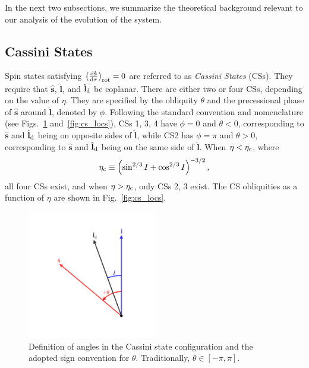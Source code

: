 \documentclass[
        fleqn,
        usenatbib,
    ]{mnras}
\newcommand*{\rd}[2]{\frac{\mathrm{d}#1}{\mathrm{d}#2}}
\newcommand*{\bm}[1]{\boldsymbol{\mathbf{#1}}}
\newcommand*{\uv}[1]{\hat{\bm{#1}}}
\newcommand*{\p}[1]{\left(#1\right)}
\begin{document}
In the next two subsections, we summarize the theoretical background relevant to
our analysis of the evolution of the system.

\subsection{Cassini States}\label{ss:cs}

Spin states satisfying $\p{\rd{\uv{s}}{\tau}}_{\rm rot} = 0$ are referred to as
\emph{Cassini States} (CSs). They require that $\uv{s}$, $\uv{l}$, and
$\uv{l}_{\rm d}$ be coplanar. There are either two or four CSs, depending
on the value of $\eta$. They are specified by the obliquity $\theta$ and the
precessional phase of $\uv{s}$ around $\uv{l}$, denoted by $\phi$. Following
the standard convention and nomenclature (see Figs.~\ref{fig:cs_vecs}
and~\ref{fig:cs_locs}), CSs 1, 3, 4 have $\phi = 0$ and $\theta < 0$,
corresponding to $\uv{s}$ and $\uv{l}_{\rm d}$ being on opposite sides of
$\uv{l}$, while CS2 has $\phi = \pi$ and $\theta > 0$, corresponding to $\uv{s}$
and $\uv{l}_{\rm d}$ being on the same side of $\uv{l}$. When $\eta < \eta_{\rm
c}$, where
\begin{equation}
    \eta_{\rm c} \equiv \p{\sin^{2/3}I + \cos^{2/3}I}^{-3/2},\label{eq:etac}
\end{equation}
all four CSs exist, and when $\eta > \eta_{\rm c}$, only CSs 2, 3 exist. The CS
obliquities as a function of $\eta$ are shown in Fig.~\ref{fig:cs_locs}.
\begin{figure}
    \includegraphics[width=0.5\textwidth]{plots_diskdisp/2_3vec.png}
    \caption{Definition of angles in the Cassini state configuration and the
    adopted sign convention for $\theta$. Traditionally, $\theta \in [-\pi,
    \pi]$.}\label{fig:cs_vecs}
\end{figure}
\end{document}
